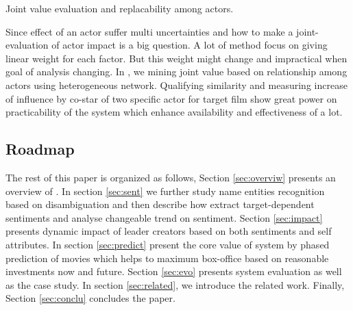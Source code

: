 \begin{difficulties} Joint value evaluation and replacability among actors.\end{difficulties}
\par Since effect of an actor suffer multi uncertainties and how to make a joint-evaluation of actor impact is a big question. A lot of method focus on giving linear weight for each factor. But this weight might change and impractical when goal of analysis changing. In \system, we mining joint value based on relationship among actors using heterogeneous network. Qualifying similarity and measuring increase of influence by co-star of two specific actor for target film show great power on practicability of the system which enhance availability and effectiveness of \system a lot.
\subsection{Roadmap}
The rest of this paper is organized as follows, Section \ref{sec:overviw} presents an overview of \system. In section \ref{sec:sent} we further study name entities recognition based on disambiguation and then describe how \system extract target-dependent sentiments and analyse changeable trend on sentiment. Section \ref{sec:impact} presents dynamic impact of leader creators based on both sentiments and self attributes. In section \ref{sec:predict} present the core value of system by phased prediction of movies which helps to maximum box-office based on reasonable investments now and future. Section \ref{sec:evo} presents system evaluation as well as the case study. In section \ref{sec:related}, we introduce the related work. Finally, Section \ref{sec:conclu} concludes the paper. 